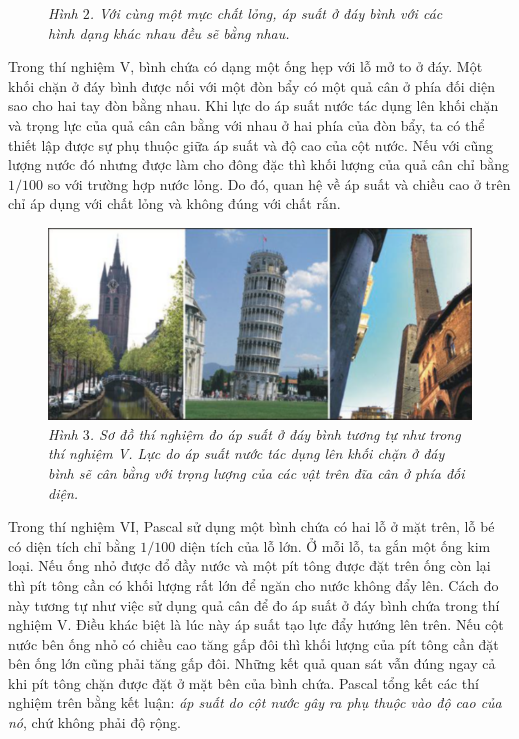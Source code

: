 \begin{multicols}{2}
\begin{figure}[H]
		\caption{\small\textit{\color{timhieukhoahoc}Hình $2$. Với cùng một mực chất lỏng, áp suất ở đáy bình với các hình dạng khác nhau đều sẽ bằng nhau.}}
		\vspace*{-10pt}
	\end{figure}
	Trong thí nghiệm V, bình chứa có dạng một ống hẹp với lỗ mở to ở đáy. Một khối chặn ở đáy bình được nối với một đòn bẩy có một quả cân ở phía đối diện sao cho hai tay đòn bằng nhau. Khi lực do áp suất nước tác dụng lên khối chặn và trọng lực của quả cân cân bằng với nhau ở hai phía của đòn bẩy, ta có thể thiết lập được sự phụ thuộc giữa áp suất và độ cao của cột nước. Nếu với cũng lượng nước đó nhưng được làm cho đông đặc thì khối lượng của quả cân chỉ bằng $1/100$ so với trường hợp nước lỏng. Do đó, quan hệ về áp suất và chiều cao ở trên chỉ áp dụng với chất lỏng và không đúng với chất rắn.
	\begin{figure}[H]
		\vspace*{-5pt}
		\centering
		\captionsetup{labelformat= empty, justification=centering}
		\includegraphics[width= 1\linewidth]{4}
		\caption{\small\textit{\color{timhieukhoahoc}Hình $3$. Sơ đồ thí nghiệm đo áp suất ở đáy bình tương tự như trong thí nghiệm V. Lực do áp suất nước tác dụng lên khối chặn ở đáy bình sẽ cân bằng với trọng lượng của các vật trên đĩa cân ở phía đối diện.}}
		\vspace*{-10pt}
	\end{figure}
	Trong thí nghiệm VI, Pascal sử dụng một bình chứa có hai lỗ ở mặt trên, lỗ bé có diện tích chỉ bằng $1/100$ diện tích của lỗ lớn. Ở mỗi lỗ, ta gắn một ống kim loại. Nếu ống nhỏ được đổ đầy nước và một pít tông được đặt trên ống còn lại thì pít tông cần có khối lượng rất lớn để ngăn cho nước không đẩy lên. Cách đo này tương tự như việc sử dụng quả cân để đo áp suất ở đáy bình chứa trong thí nghiệm V. Điều khác biệt là lúc này áp suất tạo lực đẩy hướng lên trên. Nếu cột nước bên ống nhỏ có chiều cao tăng gấp đôi thì khối lượng của pít tông cần đặt bên ống lớn cũng phải tăng gấp đôi. Những kết quả quan sát vẫn đúng ngay cả khi pít tông chặn được đặt ở mặt bên của bình chứa. Pascal tổng kết các thí nghiệm trên bằng kết luận: \textit{áp suất do cột nước gây ra phụ thuộc vào độ cao của nó}, chứ không phải độ rộng.

\end{multicols}

